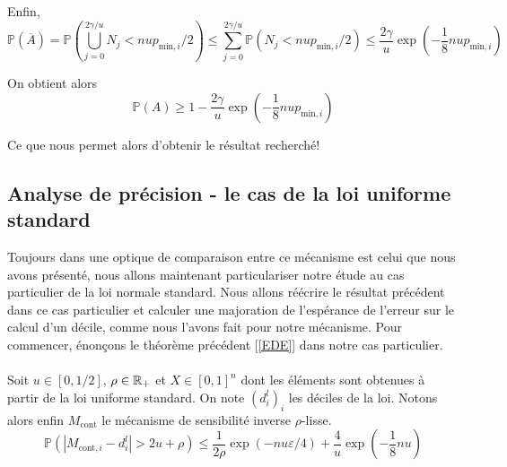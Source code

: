 Enfin,
\[
  \mathbb P \left( \overline A \right)  = \mathbb P \left( \bigcup_{j = 0}^{2\gamma /u} N_j < n u p_{\text{min}, i}/2  \right) \leq \sum_{j = 0}^{2\gamma/u} \mathbb P \left( N_j < n u p_{\text{min}, i}/2 \right) \leq \dfrac{2\gamma}{u}\exp\left( - \dfrac{1}{8}n u p_{\text{min}, i} \right)
\]


On obtient alors 
\[
    \mathbb P (A) \geq 1 - \dfrac{2\gamma}{u}\exp\left( - \dfrac{1}{8}n u p_{\text{min}, i} \right)
\]

Ce que nous permet alors d'obtenir le résultat recherché!




\subsection{Analyse de précision - le cas de la loi uniforme standard}

Toujours dans une optique de comparaison entre ce mécanisme est celui que nous avons présenté, nous allons maintenant particulariser notre étude au cas particulier de la loi normale standard. Nous allons réécrire le résultat précédent dans ce cas particulier et calculer une majoration de l’espérance de l'erreur sur le calcul d'un décile, comme nous l'avons fait pour notre mécanisme. Pour commencer, énonçons le théorème précédent [\ref{EDE}] dans notre cas particulier.\\

\label{EDE}\\
Soit \(u \in [0, 1/2]\), \(\rho \in \mathbb{R}_+\) et \(X \in [0,1]^n\) dont les éléments sont obtenues à partir de la loi uniforme standard. On note \((d_i^l)_i\) les déciles de la loi. Notons alors enfin \(M_{\text{cont}}\) le mécanisme de sensibilité inverse \(\rho\)-lisse.
\[
    \mathbb P\left( |M_{\text{cont}, i} - d_i^l| > 2u + \rho \right) \leq  \dfrac{1}{2\rho}\exp\left( -{nu\varepsilon}/{4} \right) + \dfrac{4}{u}\exp\left( - \dfrac{1}{8}n u \right) 
\]

